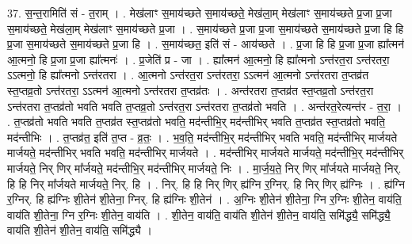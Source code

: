 \documentclass[17pt]{extarticle}
\begin{document}
37. स॒न्त॒रामिति॑ सं - त॒राम् । . मेख॑लाꣳ स॒माय॑च्छते स॒माय॑च्छते॒ मेख॑ला॒म् मेख॑लाꣳ स॒माय॑च्छते प्र॒जा प्र॒जा स॒माय॑च्छते॒ मेख॑ला॒म् मेख॑लाꣳ स॒माय॑च्छते प्र॒जा । . स॒माय॑च्छते प्र॒जा प्र॒जा स॒माय॑च्छते स॒माय॑च्छते प्र॒जा हि हि प्र॒जा स॒माय॑च्छते स॒माय॑च्छते प्र॒जा हि । . स॒माय॑च्छत॒ इति॑ सं - आय॑च्छते । . प्र॒जा हि हि प्र॒जा प्र॒जा ह्या᳚त्मन॑ आ॒त्मनो॒ हि प्र॒जा प्र॒जा ह्या᳚त्मनः॑ । . प्र॒जेति॑ प्र - जा । . ह्या᳚त्मन॑ आ॒त्मनो॒ हि ह्या᳚त्मनो ऽन्त॑रत॒रा ऽन्त॑रतरा॒ ऽऽत्मनो॒ हि ह्या᳚त्मनो ऽन्त॑रतरा । . आ॒त्मनो ऽन्त॑रत॒रा ऽन्त॑रतरा॒ ऽऽत्मन॑ आ॒त्मनो ऽन्त॑रतरा त॒प्तव्र॑त स्त॒प्तव्र॒तो ऽन्त॑रतरा॒ ऽऽत्मन॑ आ॒त्मनो ऽन्त॑रतरा त॒प्तव्र॑तः । . अन्त॑रतरा त॒प्तव्र॑त स्त॒प्तव्र॒तो ऽन्त॑रत॒रा ऽन्त॑रतरा त॒प्तव्र॑तो भवति भवति त॒प्तव्र॒तो ऽन्त॑रत॒रा ऽन्त॑रतरा त॒प्तव्र॑तो भवति । . अन्त॑रत॒रेत्यन्त॑र - त॒रा॒ । . त॒प्तव्र॑तो भवति भवति त॒प्तव्र॑त स्त॒प्तव्र॑तो भवति॒ मद॑न्तीभि॒र् मद॑न्तीभिर् भवति त॒प्तव्र॑त स्त॒प्तव्र॑तो भवति॒ मद॑न्तीभिः । . त॒प्तव्र॑त॒ इति॑ त॒प्त - व्र॒तः॒ । . भ॒व॒ति॒ मद॑न्तीभि॒र् मद॑न्तीभिर् भवति भवति॒ मद॑न्तीभिर् मार्जयते मार्जयते॒ मद॑न्तीभिर् भवति भवति॒ मद॑न्तीभिर् मार्जयते । . मद॑न्तीभिर् मार्जयते मार्जयते॒ मद॑न्तीभि॒र् मद॑न्तीभिर् मार्जयते॒ निर् णिर् मा᳚र्जयते॒ मद॑न्तीभि॒र् मद॑न्तीभिर् मार्जयते॒ निः । . मा॒र्ज॒य॒ते॒ निर् णिर् मा᳚र्जयते मार्जयते॒ निर्. हि हि निर् मा᳚र्जयते मार्जयते॒ निर्. हि । . निर्. हि हि निर् णिर् ह्य॑ग्नि र॒ग्निर्. हि निर् णिर् ह्य॑ग्निः । . ह्य॑ग्नि र॒ग्निर्. हि ह्य॑ग्निः शी॒तेन॑ शी॒तेना॒ ग्निर्. हि ह्य॑ग्निः शी॒तेन॑ । . अ॒ग्निः शी॒तेन॑ शी॒तेना॒ ग्नि र॒ग्निः शी॒तेन॒ वाय॑ति॒ वाय॑ति शी॒तेना॒ ग्नि र॒ग्निः शी॒तेन॒ वाय॑ति । . शी॒तेन॒ वाय॑ति॒ वाय॑ति शी॒तेन॑ शी॒तेन॒ वाय॑ति॒ समि॑द्ध्यै॒ समि॑द्ध्यै॒ वाय॑ति शी॒तेन॑ शी॒तेन॒ वाय॑ति॒ समि॑द्ध्यै । \newline
\end{document}

